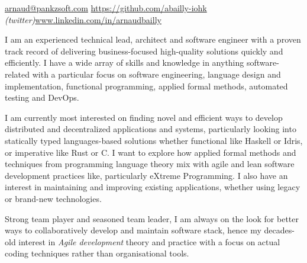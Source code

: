 \documentclass[12pt,a4paper]{article}
\begin{document}
\sloppy


\noindent\href{mailto:arnaud.at.pankzsoft.dot.com}{arnaud\mbox{}@\mbox{}pankzsoft.com}\sbull
\href{https://github.com/abailly}{https://github.com/abailly-iohk} \emph{(twitter)}\sbull\href{http://www.linkedin.com/in/arnaudbailly}{www.linkedin.com/in/arnaudbailly}  \\

\spacedhrule{0.9em}{-0.4em}  %


\begin{multicols}{2}  %
  I am an experienced technical lead, architect and software engineer with a proven track record of delivering business-focused high-quality solutions quickly and efficiently. I have a wide array of skills and knowledge in anything software-related with a particular focus on software engineering, language design and implementation, functional programming, applied formal methods, automated testing and DevOps.

  I am currently most interested on finding novel and efficient ways to develop distributed and decentralized applications and systems, particularly looking into statically typed languages-based solutions whether functional like Haskell or Idris, or imperative like Rust or C. I want to explore how applied formal methods and techniques from programming language theory mix with agile and lean software development practices like, particularly eXtreme Programming. I also have an interest in maintaining and improving existing applications, whether using legacy or brand-new technologies.

  Strong team player and seasoned team leader, I am always on the look for better ways to collaboratively develop and maintain software stack, hence my decades-old interest in \emph{Agile development} theory and practice with a focus on actual coding techniques rather than organisational tools.
\end{multicols}


\end{document}

